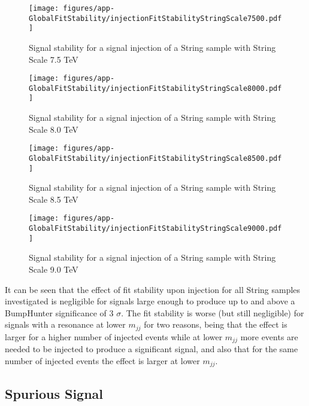 \begin{figure}
    \centering
    \texttt{[image: figures/app-GlobalFitStability/injectionFitStabilityStringScale7500.pdf]}
    \caption{Signal stability for a signal injection of a String sample with String Scale 7.5 TeV}
\end{figure}
\begin{figure}
    \centering
    \texttt{[image: figures/app-GlobalFitStability/injectionFitStabilityStringScale8000.pdf]}
    \caption{Signal stability for a signal injection of a String sample with String Scale 8.0 TeV}
\end{figure}
\begin{figure}
    \centering
    \texttt{[image: figures/app-GlobalFitStability/injectionFitStabilityStringScale8500.pdf]}
    \caption{Signal stability for a signal injection of a String sample with String Scale 8.5 TeV}
\end{figure}
\begin{figure}
    \centering
    \texttt{[image: figures/app-GlobalFitStability/injectionFitStabilityStringScale9000.pdf]}
    \caption{Signal stability for a signal injection of a String sample with String Scale 9.0 TeV}
    \label{fig:StringSignalInjectionFitStabilityStudyMs9.0TeV}
\end{figure}

It can be seen that the effect of fit stability upon injection for all String samples investigated is negligible for signals large enough to produce up to and above a BumpHunter significance of 3 $\sigma$. The fit stability is worse (but still negligible) for signals with a resonance at lower $m_{jj}$ for two reasons, being that the effect is larger for a higher number of injected events while at lower $m_{jj}$ more events are needed to be injected to produce a significant signal, and also that for the same number of injected events the effect is larger at lower $m_{jj}$.

\subsection{Spurious Signal}

